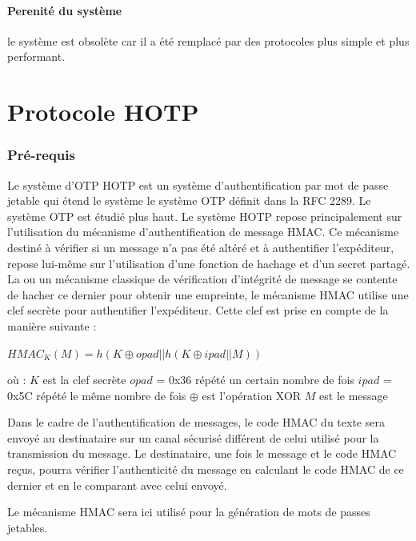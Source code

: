 \documentclass{../res/univ-projet}
\begin{document}
  \subsection{Perenité du système}
    le système est obsolète car il a été remplacé par des protocoles plus simple et plus performant.

\setcounter{section}{0}
\part{Protocole HOTP}
\section{Pré-requis}
Le système d'OTP \og{}HOTP\fg{} est un système d'authentification par mot de passe jetable qui étend le système le système OTP définit dans la RFC 2289. Le système OTP 
est étudié plus haut.
Le système HOTP repose principalement sur l'utilisation du mécanisme d'authentification de message HMAC. Ce mécanisme destiné à vérifier si un message n'a pas été altéré
et à authentifier l'expéditeur, repose lui-même sur l'utilisation d'une fonction de hachage et d'un secret partagé. La ou un mécanisme classique de vérification 
d'intégrité de message se contente de hacher ce dernier pour obtenir une empreinte, le mécanisme HMAC utilise une clef secrète pour authentifier l'expéditeur. Cette clef 
est prise en compte de la manière suivante : 
\begin{center}
$HMAC_K(M) = h(K \oplus opad || h(K \oplus ipad || M))$ 
\end{center}
où :\newline
$K$ est la clef secrète \newline
$opad$ = 0x36 répété un certain nombre de fois \newline
$ipad$ = 0x5C répété le m\^eme nombre de fois \newline
$\oplus$ est l'opération XOR \newline
$M$ est le message \newline


Dans le cadre de l'authentification de messages, le code HMAC du texte sera envoyé au destinataire sur un canal sécurisé différent de celui utilisé pour la transmission
du message. Le destinataire, une fois le message et le code HMAC reçus, pourra vérifier l'authenticité du message en calculant le code HMAC de ce dernier et en le 
comparant avec celui envoyé.

Le mécanisme HMAC sera ici utilisé pour la génération de mots de passes jetables.
\end{document}
